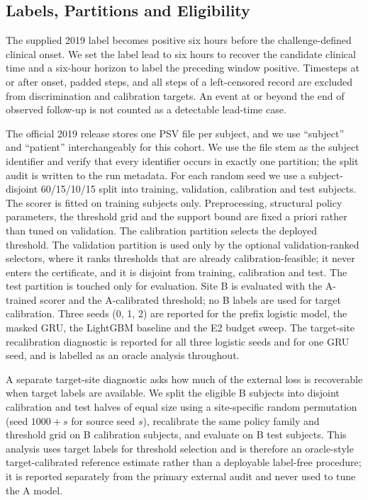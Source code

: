 \subsection{Labels, Partitions and Eligibility}

The supplied 2019 label becomes positive six hours before the challenge-defined clinical onset. We set the label lead to six hours to recover the candidate clinical time and a six-hour horizon to label the preceding window positive. Timesteps at or after onset, padded steps, and all steps of a left-censored record are excluded from discrimination and calibration targets. An event at or beyond the end of observed follow-up is not counted as a detectable lead-time case.

The official 2019 release stores one PSV file per subject, and we use ``subject'' and ``patient'' interchangeably for this cohort. We use the file stem as the subject identifier and verify that every identifier occurs in exactly one partition; the split audit is written to the run metadata. For each random seed we use a subject-disjoint 60/15/10/15 split into training, validation, calibration and test subjects. The scorer is fitted on training subjects only. Preprocessing, structural policy parameters, the threshold grid and the support bound are fixed a priori rather than tuned on validation. The calibration partition selects the deployed threshold. The validation partition is used only by the optional validation-ranked selectors, where it ranks thresholds that are already calibration-feasible; it never enters the certificate, and it is disjoint from training, calibration and test. The test partition is touched only for evaluation. Site B is evaluated with the A-trained scorer and the A-calibrated threshold; no B labels are used for target calibration. Three seeds (0, 1, 2) are reported for the prefix logistic model, the masked GRU, the LightGBM baseline and the E2 budget sweep. The target-site recalibration diagnostic is reported for all three logistic seeds and for one GRU seed, and is labelled as an oracle analysis throughout.

A separate target-site diagnostic asks how much of the external loss is recoverable when target labels are available. We split the eligible B subjects into disjoint calibration and test halves of equal size using a site-specific random permutation (seed $1000+s$ for source seed $s$), recalibrate the same policy family and threshold grid on B calibration subjects, and evaluate on B test subjects. This analysis uses target labels for threshold selection and is therefore an oracle-style target-calibrated reference estimate rather than a deployable label-free procedure; it is reported separately from the primary external audit and never used to tune the A model.

